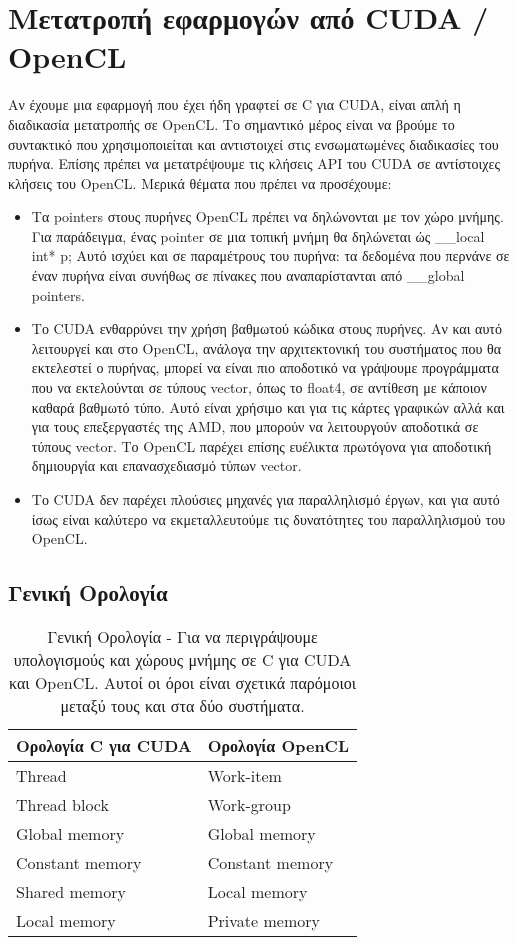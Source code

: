 \section{Μετατροπή εφαρμογών από CUDA / OpenCL}
Αν έχουμε μια εφαρμογή που έχει ήδη γραφτεί σε C για CUDA, είναι απλή η διαδικασία μετατροπής σε OpenCL.\cite{ides-2} Το σημαντικό μέρος είναι να βρούμε το συντακτικό που χρησιμοποιείται και αντιστοιχεί στις ενσωματωμένες διαδικασίες του πυρήνα. Επίσης πρέπει να μετατρέψουμε τις κλήσεις API του CUDA σε αντίστοιχες κλήσεις του OpenCL. Μερικά θέματα που πρέπει να προσέχουμε:
\begin{itemize}
	\item Τα pointers στους πυρήνες OpenCL πρέπει να δηλώνονται με τον χώρο μνήμης. Για παράδειγμα, ένας pointer σε μια τοπική μνήμη θα δηλώνεται ώς \_\_local int* p; Αυτό ισχύει και σε παραμέτρους του πυρήνα: τα δεδομένα που περνάνε σε έναν πυρήνα είναι συνήθως σε πίνακες που αναπαρίστανται από \_\_global pointers.
	\item Το CUDA ενθαρρύνει την χρήση βαθμωτού κώδικα στους πυρήνες. Αν και αυτό λειτουργεί και στο OpenCL, ανάλογα την αρχιτεκτονική του συστήματος που θα εκτελεστεί ο πυρήνας, μπορεί να είναι πιο αποδοτικό να γράψουμε προγράμματα που να εκτελούνται σε τύπους vector, όπως το float4, σε αντίθεση με κάποιον καθαρά βαθμωτό τύπο. Αυτό είναι χρήσιμο και για τις κάρτες γραφικών αλλά και για τους επεξεργαστές της AMD, που μπορούν να λειτουργούν αποδοτικά σε τύπους vector. Το OpenCL παρέχει επίσης ευέλικτα πρωτόγονα για αποδοτική δημιουργία και επανασχεδιασμό τύπων vector.
	\item Το CUDA δεν παρέχει πλούσιες μηχανές για παραλληλισμό έργων, και για αυτό ίσως είναι καλύτερο να εκμεταλλευτούμε τις δυνατότητες του παραλληλισμού του OpenCL.
\end{itemize}

\subsection{Γενική Ορολογία}
\begin{table}[!htbp]
	\begin{tabular}{|p{8cm}|p{8cm}|}
	\hline 
	\rowcolor[HTML]{C0C0C0} 
	Ορολογία C για CUDA & Ορολογία OpenCL \\ \hline
	Thread & Work-item \\ \hline
	Thread block & Work-group \\ \hline
	Global memory & Global memory \\ \hline
	Constant memory & Constant memory \\ \hline
	Shared memory & Local memory \\ \hline
	Local memory & Private memory \\ \hline
	\end{tabular}
	\caption{Γενική Ορολογία - Για να περιγράψουμε υπολογισμούς και χώρους μνήμης σε C για CUDA και OpenCL. Αυτοί οι όροι είναι σχετικά παρόμοιοι μεταξύ τους και στα δύο συστήματα.}
\end{table}
\clearpage
